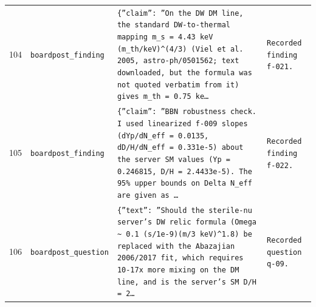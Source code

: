 \documentclass[11pt,a4paper]{article}
\begin{document}
\begin{longtable}{@{}p{}p{}p{}p{}@{}}
104 & \texttt{board}\newline\texttt{post\_\allowbreak{}finding} & \texttt{\{''claim'':\allowbreak{} ''On the DW DM line,\allowbreak{} the standard DW-to-thermal mapping m\_\allowbreak{}s =\allowbreak{} 4.43 keV (m\_\allowbreak{}th/\allowbreak{}keV)\allowbreak{}\textasciicircum{}\allowbreak{}(4/\allowbreak{}3)\allowbreak{} (Viel et al. 2005,\allowbreak{} astro-ph/\allowbreak{}0501562;\allowbreak{} text downloaded,\allowbreak{} but the formula was not quoted verbatim from it)\allowbreak{} gives m\_\allowbreak{}th =\allowbreak{} 0.75 ke\ldots{}\allowbreak{}} & \texttt{Recorded finding f-021.} \\
105 & \texttt{board}\newline\texttt{post\_\allowbreak{}finding} & \texttt{\{''claim'':\allowbreak{} ''BBN robustness check. I used linearized f-009 slopes (dYp/\allowbreak{}dN\_\allowbreak{}eff =\allowbreak{} 0.0135,\allowbreak{} dD/\allowbreak{}H/\allowbreak{}dN\_\allowbreak{}eff =\allowbreak{} 0.331e-5)\allowbreak{} about the server SM values (Yp =\allowbreak{} 0.246815,\allowbreak{} D/\allowbreak{}H =\allowbreak{} 2.4433e-5)\allowbreak{}. The 95\% upper bounds on Delta N\_\allowbreak{}eff are given as \ldots{}\allowbreak{}} & \texttt{Recorded finding f-022.} \\
106 & \texttt{board}\newline\texttt{post\_\allowbreak{}question} & \texttt{\{''text'':\allowbreak{} ''Should the sterile-nu server's DW relic formula (Omega \textasciitilde{}\allowbreak{} 0.1 (s/\allowbreak{}1e-9)\allowbreak{}(m/\allowbreak{}3 keV)\allowbreak{}\textasciicircum{}\allowbreak{}1.8)\allowbreak{} be replaced with the Abazajian 2006/\allowbreak{}2017 fit,\allowbreak{} which requires 10-17x more mixing on the DM line,\allowbreak{} and is the server's SM D/\allowbreak{}H =\allowbreak{} 2\ldots{}\allowbreak{}} & \texttt{Recorded question q-09.} \\
\bottomrule\end{longtable}
\end{document}
